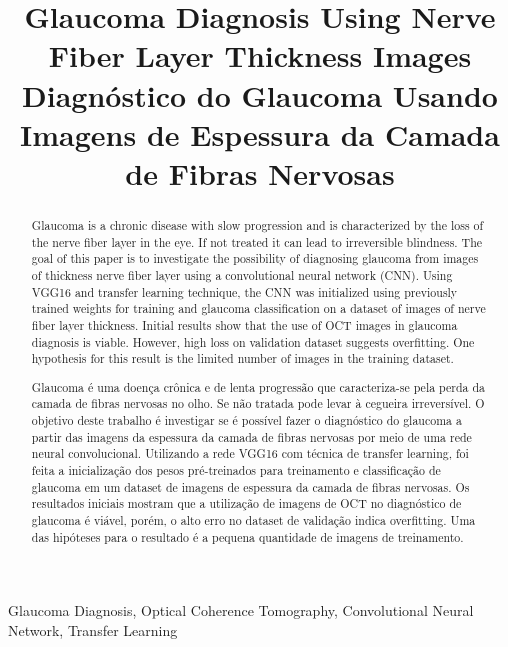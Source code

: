 \documentclass[conference]{IEEEtran}
\begin{document}
\title{Glaucoma Diagnosis Using Nerve Fiber Layer Thickness Images \\ Diagnóstico do Glaucoma Usando Imagens de Espessura da Camada de Fibras Nervosas}


\author{
}


\maketitle

\thispagestyle{fancy}

\renewcommand{\abstractname}{Abstract}
\begin{abstract}
Glaucoma is a chronic disease with slow progression
and is characterized by the loss of the nerve fiber layer in the eye.
If not treated it can lead to irreversible blindness.  The goal of
this paper is to investigate the possibility of diagnosing glaucoma
from images of thickness nerve fiber layer using a convolutional
neural network (CNN).  Using  VGG16 and transfer learning  technique,
the CNN was initialized using previously trained weights for training and
glaucoma classification on a dataset of images of nerve fiber
layer thickness. Initial results show that the use of OCT images
in glaucoma diagnosis is viable. However, high loss on validation
dataset suggests overfitting. One hypothesis for this result is the
limited number of images in the training dataset.
\end{abstract}

\renewcommand\IEEEkeywordsname{Keywords}
\begin{IEEEkeywords}
\label{Keywords}
Glaucoma Diagnosis, Optical Coherence Tomography, Convolutional Neural Network, Transfer Learning
\end{IEEEkeywords}

\renewcommand{\abstractname}{Resumo}
\begin{abstract}
\label{Resumo}
Glaucoma é uma doença crônica e de lenta progressão que caracteriza-se pela perda da camada de fibras nervosas no olho. Se não tratada pode levar à cegueira irreversível. O objetivo deste trabalho é investigar se é possível fazer o diagnóstico do glaucoma a partir das imagens da espessura da camada de fibras nervosas por meio de uma rede neural convolucional. Utilizando a rede VGG16 com técnica de transfer learning, foi feita a inicialização dos pesos pré-treinados para treinamento e classificação de glaucoma em um dataset de imagens de espessura da camada de fibras nervosas. Os resultados iniciais mostram que a utilização de imagens de OCT no diagnóstico de glaucoma é viável, porém, o alto erro no dataset de validação indica overfitting. Uma das hipóteses para o resultado é a pequena quantidade de imagens de treinamento.

\end{abstract}
\end{document}
